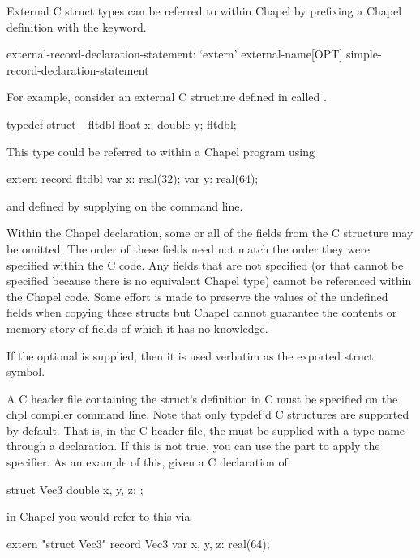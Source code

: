 External C struct types can be referred to within Chapel by prefixing
a Chapel  definition with the  keyword.
\begin{syntax}
external-record-declaration-statement:
  `extern' external-name[OPT] simple-record-declaration-statement
\end{syntax}

For example, consider an external C structure defined in  called .
\begin{chapel}
    typedef struct _fltdbl {
      float x;
      double y;
    } fltdbl;
\end{chapel}
This type could be referred to within a Chapel program using
\begin{chapel}
   extern record fltdbl {
     var x: real(32);
     var y: real(64);
   }
\end{chapel}
\noindent
and defined by supplying  on the  command line.

Within the Chapel declaration, some or all of the fields from the C
structure may be omitted.  The order of these fields need not match
the order they were specified within the C code.  Any fields that are
not specified (or that cannot be specified because there is no
equivalent Chapel type) cannot be referenced within the Chapel code.  Some
effort is made to preserve the values of the undefined fields when copying
these structs but Chapel cannot guarantee the contents or memory story of
fields of which it has no knowledge.

If the optional  is supplied, then it is used verbatim as
the exported struct symbol.

A C header file containing the struct's definition in C must be specified on the
chpl compiler command line.  Note that only typdef'd C structures are supported
by default.  That is, in the C header file, the  must be supplied
with a type name through a  declaration. If this is not true, you
can use the  part to apply the  specifier.
As an example of this, given a C declaration of:

\begin{chapel}
  struct Vec3 {
    double x, y, z;
  };
\end{chapel}

in Chapel you would refer to this  via

\begin{chapel}
  extern "struct Vec3" record Vec3 {
    var x, y, z: real(64);
  }
\end{chapel}


